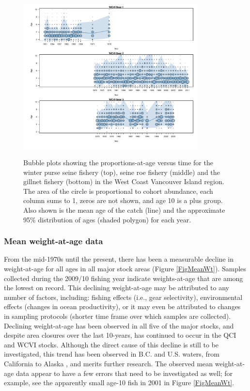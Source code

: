 \begin{figure}
	\centering
	\includegraphics[width=0.85\textwidth]{../Figs/iscam_fig_AgeCompsWCVI.pdf}\\
	\caption{Bubble plots showing the proportions-at-age versus time for the winter purse seine fishery (top), seine roe fishery (middle) and the gillnet fishery (bottom) in the West Coast Vancouver Island region.  The area of the circle is proportional to cohort abundance, each column sums to 1, zeros are not shown, and age 10 is a plus group. Also shown is the mean age of the catch (line) and the approximate 95\% distribution of ages (shaded polygon) for each year.}\label{FigAgeCompsWCVI}
\end{figure}





	\subsubsection{Mean weight-at-age data}

	From the mid-1970s until the present, there has been a measurable decline in weight-at-age for all ages in all major stock areas (Figure \ref{FigMeanWt}). Samples collected during the 2009/10 fishing year indicate weights-at-age that are among the lowest on record. This declining weight-at-age may be attributed to any number of factors, including: fishing effects (i.e., gear selectivity), environmental effects (changes in ocean productivity), or it may even be attributed to changes in sampling protocols (shorter time frame over which samples are collected). Declining weight-at-age has been observed in all five of the major stocks, and despite area closures over the last 10-years, has continued to occur in the QCI and WCVI stocks. Although the direct cause of this decline is still to be investigated, this trend has been observed in B.C. and U.S. waters, from California to Alaska \citep{schweigert2002herring}, and merits further research.	The observed mean weight-at-age data appear to have a few  errors that need to be investigated as well; for example, see the apparently small age-10 fish in 2001 in Figure \ref{FigMeanWt}.

